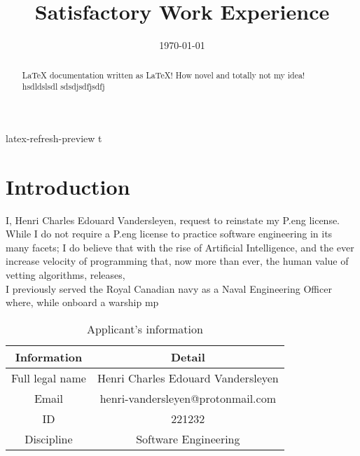\message{ !name(apegbcWorkExperience.tex)}\documentclass[12pt]{article}
\title{Satisfactory Work Experience}
\author{\fullname}
\date{\today}
\def\fullname{Henri Charles Edouard Vandersleyen}
\begin{document}

\maketitle
latex-refresh-preview t
\newpage
\tableofcontents

\newpage
\section{Introduction}
I, \fullname, request to reinstate my P.eng license. While I do not require a
P.eng license to practice software engineering in its many facets; I do believe
that with the rise of Artificial Intelligence, and the ever increase velocity of
programming that, now more than ever, the human value of vetting algorithms,
releases, \\

I previously served the Royal Canadian navy as a Naval Engineering Officer
where, while onboard a warship mp


\begin{abstract}
 \LaTeX{} documentation written as \LaTeX! How novel and totally not
 my idea!
 hsdldslsdl
 sdsdjsdfjsdfj
\end{abstract}
\begin{Applicant Information}
\begin{table}[H]
  \caption{Applicant's information}
  \begin{tabular}{c|c}  %
    Information &  Detail \\ %
    \hline %
    Full legal name & \fullname  \\
    Email & henri-vandersleyen@protonmail.com \\
    ID & 221232 \\
    Discipline & Software Engineering
  \end{tabular}
\end{table}
\end{Applicant Information}
\end{document}
